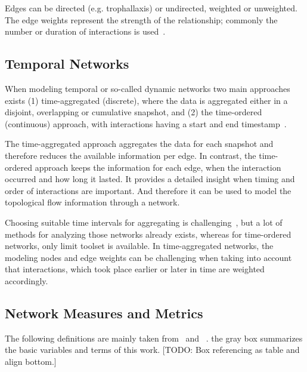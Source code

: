 Edges can be directed (e.g. trophallaxis) or undirected, weighted or unweighted. The edge weights represent the strength of the relationship; commonly the number or duration of interactions is used~\cite{farine2015constructing}.


\subsection{Temporal Networks}
When modeling temporal or so-called dynamic networks two main approaches exists (1) time-aggregated (discrete), where the data is aggregated either in a disjoint, overlapping or cumulative snapshot, and (2) the time-ordered (continuous) approach, with interactions having a start and end timestamp~\cite{moody2005dynamic, Pinter-Wollman2014, blonder2012temporal}.

The time-aggregated approach aggregates the data for each snapshot and therefore reduces the available information per edge. In contrast, the time-ordered approach keeps the information for each edge, when the interaction occurred and how long it lasted. It provides a detailed insight when timing and order of interactions are important.  And therefore it can be used to model the topological flow information through a network.

Choosing suitable time intervals for aggregating is challenging~\cite{Pinter-Wollman2014}, but a lot of methods for analyzing those networks already exists, whereas for time-ordered networks, only limit toolset is available. In time-aggregated networks, the modeling nodes and edge weights can be challenging when taking into account that interactions, which took place earlier or later in time are weighted accordingly.

\subsection{Network Measures and Metrics}
\label{sec:definitions}
The following definitions are mainly taken from~\textcite{barabasi2016network} and ~\textcite{newman2010networks}. the gray box summarizes the basic variables and terms of this work. [TODO: Box referencing as table and align bottom.]

